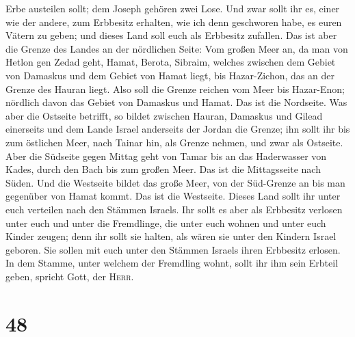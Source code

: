 Erbe austeilen sollt; dem Joseph gehören zwei Lose.  Und
zwar sollt ihr es, einer wie der andere, zum Erbbesitz erhalten, wie ich
denn geschworen habe, es euren Vätern zu geben; und dieses Land soll
euch als Erbbesitz zufallen.  Das ist aber die Grenze des
Landes an der nördlichen Seite: Vom großen Meer an, da man von Hetlon
gen Zedad geht, Hamat,  Berota, Sibraim, welches zwischen
dem Gebiet von Damaskus und dem Gebiet von Hamat liegt, bis
Hazar-Zichon, das an der Grenze des Hauran liegt.  Also
soll die Grenze reichen vom Meer bis Hazar-Enon; nördlich davon das
Gebiet von Damaskus und Hamat.  Das ist die Nordseite.
Was aber die Ostseite betrifft, so bildet zwischen Hauran, Damaskus und
Gilead einerseits und dem Lande Israel anderseits der Jordan die Grenze;
ihn sollt ihr bis zum östlichen Meer, nach Tainar hin, als Grenze
nehmen, und zwar als Ostseite.  Aber die Südseite gegen
Mittag geht von Tamar bis an das Haderwasser von Kades, durch den Bach
bis zum großen Meer. Das ist die Mittagsseite nach Süden.
 Und die Westseite bildet das große Meer, von der
Süd-Grenze an bis man gegenüber von Hamat kommt. Das ist die Westseite.
 Dieses Land sollt ihr unter euch verteilen nach den
Stämmen Israels.  Ihr sollt es aber als Erbbesitz
verlosen unter euch und unter die Fremdlinge, die unter euch wohnen und
unter euch Kinder zeugen; denn ihr sollt sie halten, als wären sie unter
den Kindern Israel geboren. Sie sollen mit euch unter den Stämmen
Israels ihren Erbbesitz erlosen.  In dem Stamme, unter
welchem der Fremdling wohnt, sollt ihr ihm sein Erbteil geben, spricht
Gott, der \textsc{Herr}.

\hypertarget{section-47}{%
\section{48}\label{section-47}}

